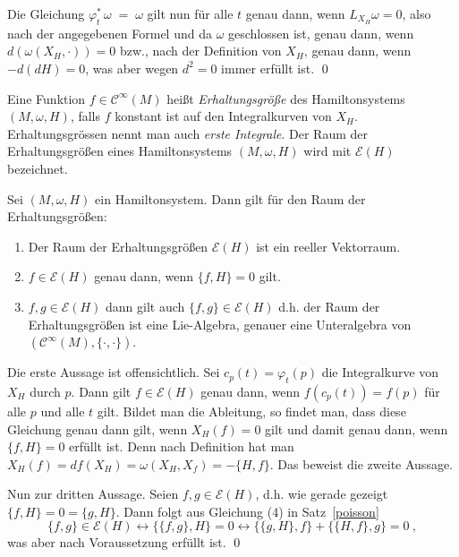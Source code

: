 \documentclass[%
	paper=a5,%
	fleqn,%
	DIV=18,%
	BCOR=0mm,
	fontsize=11pt,
	titlepage=false,%
	bibliography=totoc,
	DIV=18,%
	twoside=true,
	pdftitle=Riemannsche Geometrie,
	pdfauthor=Uwe Semmelmann,
	numbers=noendperiod]%
	{scrbook}
\begin{document}
\medskip

Die Gleichung $\varphi^*_t \,\omega \;=\; \omega $ gilt nun f\"ur alle $t$ genau dann, wenn
$L_{X_H}\omega = 0$, also nach der angegebenen Formel und da $\omega$ geschlossen ist, genau dann, wenn
$d (\omega(X_H, \cdot)) = 0$ bzw., nach der Definition von $X_H$, genau dann, wenn $- d (d H) = 0$, was
aber wegen $d^2=0$ immer erf\"ullt ist.
\qed

\bigskip

\begin{Definition}
Eine Funktion $f\in \mathcal C^\infty(M)$ hei\ss t \emph{ Erhaltungsgr\"o\ss e} des
Hamilton\-systems $(M, \omega, H)$, falls $f$ konstant ist auf den Integralkurven
von $X_H$. Erhaltungs\-gr\"ossen nennt man auch \emph{ erste Integrale}. Der Raum der
Erhaltungsgr\"o\ss en eines Hamiltonsystems $(M, \omega, H)$  wird mit
$\mathcal E(H)$ bezeichnet.\fish
\end{Definition}

\bigskip

\begin{Satz}
Sei $(M, \omega, H)$ ein Hamiltonsystem. Dann gilt f\"ur den Raum der Erhaltungsgr\"o\ss en:
\begin{enumerate}
\item
 Der Raum der Erhaltungsgr\"o\ss en $\mathcal E(H)$ ist ein reeller Vektorraum.
\item
 $f\in \mathcal E(H)$ genau dann, wenn $\{f, H\} = 0$ gilt.
\item
 $f, g \in \mathcal E(H)$ dann gilt auch $\{f, g\} \in \mathcal E(H)$
        d.h. der Raum der Erhaltungsgr\"o\ss en ist eine Lie-Algebra, genauer eine Unteralgebra
       von $(\mathcal C^\infty(M), \{\cdot, \cdot\})$.\fish
\end{enumerate}
\end{Satz}
\proof
Die erste Aussage ist offensichtlich.
Sei $c_p(t) = \varphi_t(p)$ die Integralkurve von $X_H$ durch $p$. Dann gilt $f\in \mathcal E (H)$
genau dann, wenn $f(c_p(t))=f(p)$ f\"ur alle $p$ und alle $t$ gilt. Bildet man die Ableitung, so
findet man, dass diese Gleichung genau dann gilt, wenn $X_H(f)=0$ gilt und damit genau dann,
wenn $\{f, H\}= 0$ erf\"ullt ist. Denn nach Definition hat man
$X_H(f) = df (X_H) = \omega(X_H, X_f) = - \{H, f\}$. Das beweist die zweite Aussage.

\medskip

Nun zur dritten Aussage.
Seien $f, g \in \mathcal E(H)$, d.h. wie gerade gezeigt $\{f, H\} = 0 = \{g, H\}$. Dann folgt
aus Gleichung (4) in Satz~\ref{poisson}
$$
\{f,g\} \in \mathcal E (H) \leftrightarrow \{\{f,g\}, H\} = 0 \leftrightarrow
\{ \{g, H\}, f\} + \{\{H,f\}, g\}=0 \ ,
$$
was aber nach Voraussetzung erf\"ullt ist.
\qed
\end{document}
